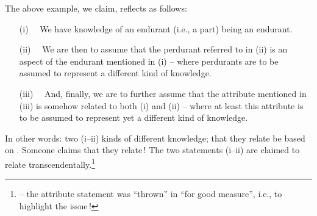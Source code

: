 \pos{\psno}{\mnewfoil}

\noindent
\mnewfoil 
\begynd
\pind The above example, we claim, reflects
       as follows:
\afslut
\begin{itemize}
\item[(i)] \ \ We have knowledge of an endurant (i.e., a part) being an endurant.
\item[(ii)] \ \  We are then to assume that the perdurant referred to in
             (ii) is an aspect of the endurant mentioned in (i) -- where
             perdurants are to be assumed to represent a different
             kind of knowledge.
\item[(iii)] \ \  And, finally, we are to further assume that the attribute
             mentioned in (iii) is somehow related to both (i) and (ii) -- where
             at least this attribute is to be assumed to represent yet
             a different kind of knowledge.
\end{itemize}
\noindent%
\mnewfoil%
\begynd%
\pind In other words:
\begynd
\pind two (i--ii) kinds of different knowledge;
\pind that they relate   be based on .  
\pind Someone claims that they relate\,!    
\afslut
\pind The two statements (i--ii) are claimed to relate
      transcendentally.\footnote{\LLLL -- the attribute statement was
      ``thrown'' in ``for good measure'', \nyl i.e., to highlight the
      issue\,!}  
\afslut

